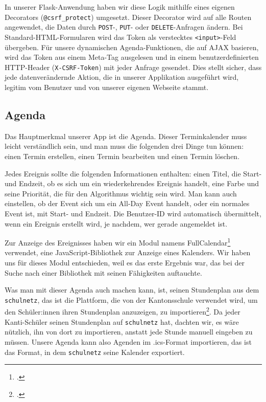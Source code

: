 \documentclass[12pt,a4paper]{report}
\begin{document}
In unserer Flask-Anwendung haben wir diese Logik mithilfe eines eigenen Decorators (\texttt{@csrf\_protect}) umgesetzt. Dieser Decorator wird auf alle Routen angewendet, die Daten durch \texttt{POST}-, \texttt{PUT}- oder \texttt{DELETE}-Anfragen ändern. Bei Standard-HTML-Formularen wird das Token als verstecktes \texttt{<input>}-Feld übergeben. Für unsere dynamischen Agenda-Funktionen, die auf AJAX basieren, wird das Token aus einem Meta-Tag ausgelesen und in einem benutzerdefinierten HTTP-Header (\texttt{X-CSRF-Token}) mit jeder Anfrage gesendet. Dies stellt sicher, dass jede datenverändernde Aktion, die in unserer Applikation ausgeführt wird, legitim vom Benutzer und von unserer eigenen Webseite stammt.


\subsection{Agenda}
Das Hauptmerkmal unserer App ist die Agenda. Dieser Terminkalender muss leicht verständlich sein, und man muss die folgenden drei Dinge tun können: einen Termin erstellen, einen Termin bearbeiten und einen Termin löschen.

Jedes Ereignis sollte die folgenden Informationen enthalten: einen Titel, die Start- und Endzeit, ob es sich um ein wiederkehrendes Ereignis handelt, eine Farbe und seine Priorität, die für den Algorithmus wichtig sein wird. Man kann auch einstellen, ob der Event sich um ein All-Day Event handelt, oder ein normales Event ist, mit Start- und Endzeit. Die Benutzer-ID wird automatisch übermittelt, wenn ein Ereignis erstellt wird, je nachdem, wer gerade angemeldet ist.

Zur Anzeige des Ereignisses haben wir ein Modul namens FullCalendar\footcite{full_calendar} verwendet, eine JavaScript-Bibliothek zur Anzeige eines Kalenders. Wir haben uns für dieses Modul entschieden, weil es das erste Ergebnis war, das bei der Suche nach einer Bibliothek mit seinen Fähigkeiten auftauchte. 

Was man mit dieser Agenda auch machen kann, ist, seinen Stundenplan aus dem \texttt{schulnetz}, das ist die Plattform, die von der Kantonsschule verwendet wird, um den Schüler:innen ihren Stundenplan anzuzeigen, zu importieren\footcite{icalendar}. Da jeder Kanti-Schüler seinen Stundenplan auf \texttt{schulnetz} hat, dachten wir, es wäre nützlich, ihn von dort zu importieren, anstatt jede Stunde manuell eingeben zu müssen. Unsere Agenda kann also Agenden im .ics-Format importieren, das ist das Format, in dem \texttt{schulnetz} seine Kalender exportiert.
\end{document}
